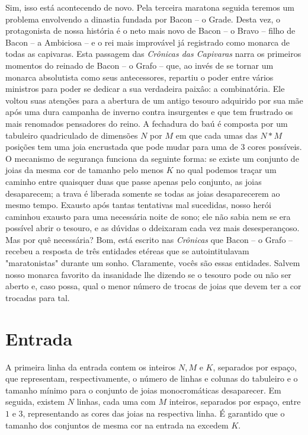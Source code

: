 Sim, isso está acontecendo de novo.
Pela terceira maratona seguida teremos um problema envolvendo a dinastia fundada por Bacon -- o Grade.
Desta vez, o protagonista de nossa história é o neto mais novo de Bacon -- o Bravo -- filho de Bacon -- a Ambiciosa -- e o rei mais improvável já registrado como monarca de todas as capivaras.
Esta passagem das \textit{Crônicas das Capivaras} narra os primeiros momentos do reinado de Bacon -- o Grafo -- que, ao invés de se tornar um monarca absolutista como seus antecessores, repartiu o poder entre vários ministros para poder se dedicar a sua verdadeira paixâo: a combinatória.
Ele voltou suas atenções para a abertura de um antigo tesouro adquirido por sua mãe após uma dura campanha de inverno contra insurgentes e que tem frustrado os mais renomados pensadores do reino.
A fechadura do baú é composta por um tabuleiro quadriculado de dimensões $N$ por $M$ em que cada umas das $N*M$ posições tem uma joia encrustada que pode mudar para uma de $3$ cores possíveis.
O mecanismo de segurança funciona da seguinte forma: se existe um conjunto de joias da mesma cor de tamanho pelo menos $K$ no qual podemos traçar um caminho entre quaisquer duas que passe apenas pelo conjunto, as joias desaparecem; a trava é liberada somente se todas as joias desaparecerem ao mesmo tempo.
Exausto após tantas tentativas mal sucedidas, nosso herói caminhou exausto para uma necessária noite de sono; ele não sabia nem se era possível abrir o tesouro, e as dúvidas o ddeixaram cada vez mais desesperançoso.
Mas por quê necessária?
Bom, está escrito nas \textit{Crônicas} que Bacon -- o Grafo -- recebeu a resposta de três entidades etéreas que se autointitulavam "maratonistas" durante um sonho.
Claramente, vocês são essas entidades.
Salvem nosso monarca favorito da insanidade lhe dizendo se o tesouro pode ou não ser aberto e, caso possa, qual o menor número de trocas de joias que devem ter a cor trocadas para tal.


\section*{Entrada}

A primeira linha da entrada contem os inteiros $N, M$ e $K$, separados por espaço, que representam, respectivamente, o número de linhas e colunas do tabuleiro e o tamanho mínimo para o conjunto de joias monocromáticas desaparecer.
Em seguida, existem $N$ linhas, cada uma com $M$ inteiros, separados por espaço, entre $1$ e $3$, representando as cores das joias na respectiva linha.
É garantido que o tamanho dos conjuntos de mesma cor na entrada na excedem $K$.

